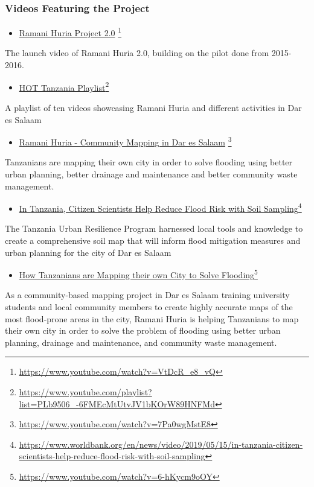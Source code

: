 \documentclass[a4paper,12pt,twoside]{article}
\begin{document}
\subsubsection{Videos Featuring the Project}
\bigskip
\begin{itemize}
    \item \href{https://www.youtube.com/watch?v=VtDcR_e8_vQ}{Ramani Huria Project 2.0} \footnote{\url{https://www.youtube.com/watch?v=VtDcR_e8_vQ}}
\end{itemize}
The launch video of Ramani Huria 2.0, building on the pilot done from 2015-2016.
\begin{itemize}
    \item \href{https://www.youtube.com/playlist?list=PLb9506_-6FMEcMtUtvJV1bKOrW89HNFMd}{HOT Tanzania Playlist}\footnote{\url{https://www.youtube.com/playlist?list=PLb9506_-6FMEcMtUtvJV1bKOrW89HNFMd}}
\end{itemize}
A playlist of ten videos showcasing Ramani Huria and different activities in Dar es Salaam

\begin{itemize}
    \item \href{https://www.youtube.com/watch?v=7Pa0wgMstE8}{Ramani Huria - Community Mapping in Dar es Salaam} \footnote{\url{https://www.youtube.com/watch?v=7Pa0wgMstE8}}
\end{itemize}
Tanzanians are mapping their own city in order to solve flooding using better urban planning, better drainage and maintenance and better community waste management.

\begin{itemize}
    \item \href{https://www.worldbank.org/en/news/video/2019/05/15/in-tanzania-citizen-scientists-help-reduce-flood-risk-with-soil-sampling}{In Tanzania, Citizen Scientists Help Reduce Flood Risk with Soil Sampling}\footnote{\url{https://www.worldbank.org/en/news/video/2019/05/15/in-tanzania-citizen-scientists-help-reduce-flood-risk-with-soil-sampling}}
\end{itemize}
The Tanzania Urban Resilience Program harnessed local tools and knowledge to create a comprehensive soil map that will inform flood mitigation measures and urban planning for the city of Dar es Salaam

\begin{itemize}
    \item \href{https://www.youtube.com/watch?v=6-hKycm9oOY}{How Tanzanians are Mapping their own City to Solve Flooding}\footnote{\url{https://www.youtube.com/watch?v=6-hKycm9oOY}}
\end{itemize}
As a community-based mapping project in Dar es Salaam training university students and local community members to create highly accurate maps of the most flood-prone areas in the city, Ramani Huria is helping Tanzanians to map their own city in order to solve the problem of flooding using better urban planning, drainage and maintenance, and community waste management.
\end{document}
